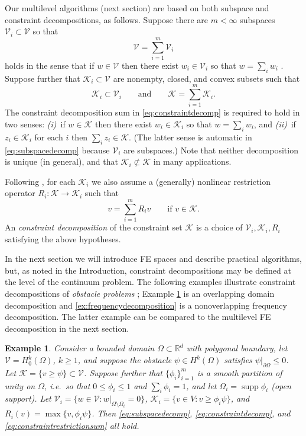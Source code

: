 \documentclass[letterpaper,final,12pt,reqno]{amsart}
\theoremstyle{cstyle}
\theoremstyle{dstyle}
\newtheorem{example}[theorem]{Example}
\numberwithin{equation}{section}
\numberwithin{figure}{section}
\numberwithin{table}{section}
\numberwithin{theorem}{section}
\newcommand{\RR}{\mathbb{R}}
\newcommand{\cK}{\mathcal{K}}
\newcommand{\cV}{\mathcal{V}}
\newcommand{\supp}{\operatorname{supp}}
\begin{document}
Our multilevel algorithms (next section) are based on both subspace and constraint decompositions, as follows.  Suppose there are $m<\infty$ subspaces $\cV_i \subset \cV$ so that
\begin{equation}
\cV = \sum_{i=1}^m \cV_i \label{eq:subspacedecomp}
\end{equation}
holds in the sense that if $w \in \cV$ then there exist $w_i \in \cV_i$ so that $w = \sum_i w_i$ \cite{Xu1992}.  Suppose further that $\cK_i \subset \cV$ are nonempty, closed, and convex subsets such that
\begin{equation}
\cK_i \subset \cV_i \qquad \text{and} \qquad \cK = \sum_{i=1}^m \cK_i. \label{eq:constraintdecomp}
\end{equation}
The constraint decomposition \cite{Tai2003} sum in \eqref{eq:constraintdecomp} is required to hold in two senses: \emph{(i)}~if $w \in \cK$ then there exist $w_i \in \cK_i$ so that $w = \sum_i w_i$, and \emph{(ii)}~if $z_i \in \cK_i$ for each $i$ then $\sum_i z_i \in \cK$.  (The latter sense is automatic in \eqref{eq:subspacedecomp} because $\cV_i$ are subspaces.)  Note that neither decomposition is unique (in general), and that $\cK_i \not\subset \cK$ in many applications.

Following \cite{Tai2003}, for each $\cK_i$ we also assume a (generally) nonlinear restriction operator $R_i : \cK \to \cK_i$ such that
\begin{equation}
v = \sum_{i=1}^m R_i v \qquad \text{if } v \in \cK.  \label{eq:constraintrestrictionsum}
\end{equation}
An \emph{constraint decomposition} of the constraint set $\cK$ is a choice of $\cV_i,\cK_i,R_i$ satisfying the above hypotheses.

In the next section we will introduce FE spaces and describe practical algorithms, but, as noted in the Introduction, constraint decompositions may be defined at the level of the continuum problem.  The following examples illustrate constraint decompositions of \emph{obstacle problems} \cite{GraeserKornhuber2009}; Example \ref{ex:domaindecomposition} is an overlapping domain decomposition and \ref{ex:frequencydecomposition} is a nonoverlapping frequency decomposition.  The latter example can be compared to the multilevel FE decomposition in the next section.

\begin{example}  \label{ex:domaindecomposition}  Consider a bounded domain $\Omega \subset \RR^d$ with polygonal boundary, let $\cV = H_0^k(\Omega)$, $k\ge 1$, and suppose the obstacle $\psi \in H^k(\Omega)$ satisfies $\psi|_{\partial \Omega} \le 0$.  Let $\cK = \{v \ge \psi\} \subset \cV$.  Suppose further that $\{\phi_i\}_{i=1}^m$ is a smooth partition of unity on $\Omega$, i.e.~so that $0 \le \phi_i\le 1$ and $\sum_i \phi_i = 1$, and let $\Omega_i = \supp \phi_i$ (open support).  Let $\cV_i = \{w \in \cV:w|_{\Omega \setminus \Omega_i} =0 \}$, $\cK_i = \{v \in V: v \ge \phi_i \psi\}$, and $R_i(v) = \max\{v,\phi_i \psi\}$.  Then \eqref{eq:subspacedecomp}, \eqref{eq:constraintdecomp}, and \eqref{eq:constraintrestrictionsum} all hold.
\end{example}
\end{document}
